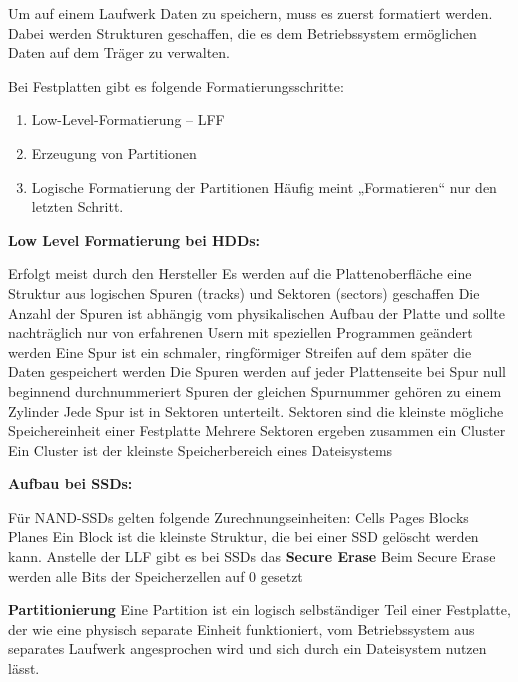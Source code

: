 \documentclass[10pt]{article}
\begin{document}
\begin{flushleft}
Um auf einem Laufwerk Daten zu speichern, muss es zuerst formatiert werden. Dabei werden Strukturen geschaffen, die es dem Betriebssystem ermöglichen Daten auf dem Träger zu verwalten.

Bei Festplatten gibt es folgende Formatierungsschritte:
\begin{enumerate}
    \item Low-Level-Formatierung – LFF 
    \item Erzeugung von Partitionen
    \item Logische Formatierung der Partitionen
Häufig meint „Formatieren“ nur den letzten Schritt.
\end{enumerate}


\textbf{Low Level Formatierung bei HDDs:}
\begin{outline}
    \1 Erfolgt meist durch den Hersteller
    \1 Es werden auf die Plattenoberfläche eine Struktur aus logischen Spuren (tracks) und Sektoren (sectors) geschaffen
    \1 Die Anzahl der Spuren ist abhängig vom physikalischen Aufbau der Platte und sollte nachträglich nur von erfahrenen Usern mit speziellen Programmen geändert werden
    \1 Eine Spur ist ein schmaler, ringförmiger Streifen auf dem später die Daten gespeichert werden
    \1 Die Spuren werden auf jeder Plattenseite bei Spur null beginnend durchnummeriert
    \1 Spuren der gleichen Spurnummer gehören zu einem Zylinder
    \1 Jede Spur ist in Sektoren unterteilt. Sektoren sind die kleinste mögliche Speichereinheit einer Festplatte
    \1 Mehrere Sektoren ergeben zusammen ein Cluster
    \1 Ein Cluster ist der kleinste Speicherbereich eines Dateisystems
\end{outline}

\textbf{Aufbau bei SSDs:}
\begin{outline}
    \1 Für NAND-SSDs gelten folgende Zurechnungseinheiten:
    \2 Cells \textrightarrow\space Pages \textrightarrow\space Blocks \textrightarrow\space Planes
    \1 Ein Block ist die kleinste Struktur, die bei einer SSD gelöscht werden kann.
    \1 Anstelle der LLF gibt es bei SSDs das \textbf{Secure Erase}
    \1 Beim Secure Erase werden alle Bits der Speicherzellen auf 0 gesetzt
\end{outline}


\textbf{Partitionierung}
Eine Partition ist ein logisch selbständiger Teil einer Festplatte, der wie eine physisch separate Einheit funktioniert, vom Betriebssystem aus separates Laufwerk angesprochen wird und sich durch ein Dateisystem nutzen lässt.


\end{flushleft}
\end{document}
